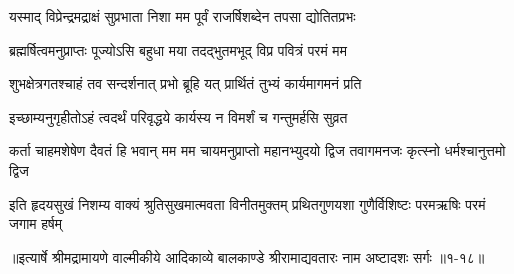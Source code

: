 \twolineshloka
{यस्माद् विप्रेन्द्रमद्राक्षं सुप्रभाता निशा मम}
{पूर्वं राजर्षिशब्देन तपसा द्योतितप्रभः} %

\twolineshloka
{ब्रह्मर्षित्वमनुप्राप्तः पूज्योऽसि बहुधा मया}
{तदद्भुतमभूद् विप्र पवित्रं परमं मम} %

\twolineshloka
{शुभक्षेत्रगतश्चाहं तव सन्दर्शनात् प्रभो}
{ब्रूहि यत् प्रार्थितं तुभ्यं कार्यमागमनं प्रति} %

\twolineshloka
{इच्छाम्यनुगृहीतोऽहं त्वदर्थं परिवृद्धये}
{कार्यस्य न विमर्शं च गन्तुमर्हसि सुव्रत} %

\threelineshloka
{कर्ता चाहमशेषेण दैवतं हि भवान् मम}
{मम चायमनुप्राप्तो महानभ्युदयो द्विज}
{तवागमनजः कृत्स्नो धर्मश्चानुत्तमो द्विज} %

\twolineshloka
{इति हृदयसुखं निशम्य वाक्यं श्रुतिसुखमात्मवता विनीतमुक्तम्}
{प्रथितगुणयशा गुणैर्विशिष्टः परमऋषिः परमं जगाम हर्षम्} %


॥इत्यार्षे श्रीमद्रामायणे वाल्मीकीये आदिकाव्ये बालकाण्डे श्रीरामाद्यवतारः नाम अष्टादशः सर्गः ॥१-१८॥
